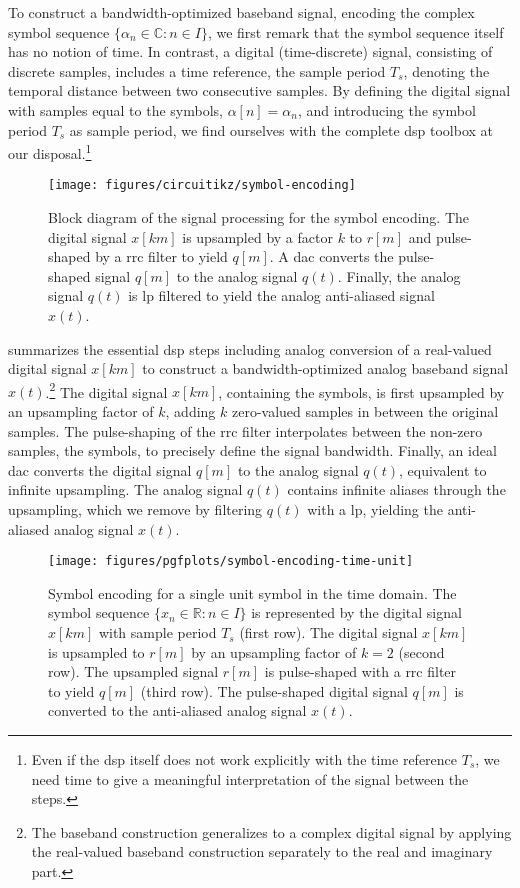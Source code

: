 To construct a bandwidth-optimized baseband signal, encoding the complex symbol sequence $\{\alpha_n\in\mathbb{C}\colon n\in I\}$, we first remark that the symbol sequence itself has no notion of time.
In contrast, a digital (time-discrete) signal, consisting of discrete samples, includes a time reference, the sample period $T_s$, denoting the temporal distance between two consecutive samples.
By defining the digital signal with samples equal to the symbols, $\alpha[n]=\alpha_n$, and introducing the symbol period $T_s$ as sample period, we find ourselves with the complete \gls{dsp} toolbox at our disposal.\footnote{Even if the \gls{dsp} itself does not work explicitly with the time reference $T_s$, we need time to give a meaningful interpretation of the signal between the steps.}
\begin{figure}[htb]
	\centering
	\texttt{[image: figures/circuitikz/symbol-encoding]}
	\caption{Block diagram of the signal processing for the symbol encoding. The digital signal $x[km]$ is upsampled by a factor $k$ to $r[m]$ and pulse-shaped by a \gls{rrc} filter to yield $q[m]$. A \gls{dac} converts the pulse-shaped signal $q[m]$ to the analog signal $q(t)$. Finally, the analog signal $q(t)$ is \gls{lp} filtered to yield the analog anti-aliased signal $x(t)$.}\label{fig:symbol_encoding}
\end{figure}
 summarizes the essential \gls{dsp} steps including analog conversion of a real-valued digital signal $x[km]$ to construct a bandwidth-optimized analog baseband signal $x(t)$.\footnote{The baseband construction generalizes to a complex digital signal by applying the real-valued baseband construction separately to the real and imaginary part.}
The digital signal $x[km]$, containing the symbols, is first upsampled by an upsampling factor of $k$, adding $k$ zero-valued samples in between the original samples.
The pulse-shaping of the \gls{rrc} filter interpolates between the non-zero samples, the symbols, to precisely define the signal bandwidth.
Finally, an ideal \gls{dac} converts the digital signal $q[m]$ to the analog signal $q(t)$, equivalent to infinite upsampling.
The analog signal $q(t)$ contains infinite aliases through the upsampling, which we remove by filtering $q(t)$ with a \gls{lp}, yielding the anti-aliased analog signal $x(t)$.
\begin{figure}[htb]
	\centering
	\texttt{[image: figures/pgfplots/symbol-encoding-time-unit]}
	\caption{Symbol encoding for a single unit symbol in the time domain. The symbol sequence $\{x_n\in\mathbb{R}\colon n\in I\}$ is represented by the digital signal $x[km]$ with sample period $T_s$ (first row). The digital signal $x[km]$ is upsampled to $r[m]$ by an upsampling factor of $k=2$ (second row). The upsampled signal $r[m]$ is pulse-shaped with a \gls{rrc} filter to yield $q[m]$ (third row). The pulse-shaped digital signal $q[m]$ is converted to the anti-aliased analog signal $x(t)$.}\label{fig:baseband_construction_unit_time}
\end{figure}
